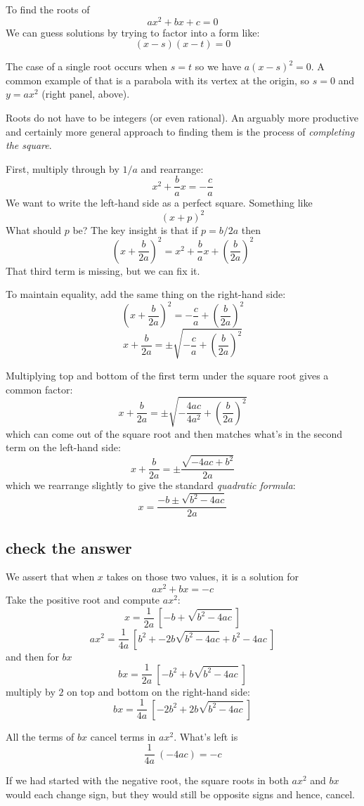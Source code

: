 \documentclass[11pt, oneside]{article}
\begin{document}
To find the roots of
\[ ax^2 + bx + c = 0 \]
We can guess solutions by trying to factor into a form like:
\[ (x - s)(x - t) = 0 \]

The case of a single root occurs when $s = t$ so we have $a(x - s)^2 = 0$.  A common example of that is a parabola with its vertex at the origin, so $s = 0$ and $y = ax^2$ (right panel, above).

Roots do not have to be integers (or even rational).  An arguably more productive and certainly more general approach to finding them is the process of \emph{completing the square}.  

First, multiply through by $1/a$ and rearrange:
\[ x^2 + \frac{b}{a} x = - \frac{c}{a} \]
We want to write the left-hand side as a perfect square.  Something like
\[ (x + p)^2 \]
What should $p$ be?  The key insight is that if $p = b/2a$ then
\[ (x + \frac{b}{2a})^2 = x^2 + \frac{b}{a}x + (\frac{b}{2a})^2 \]
That third term is missing, but we can fix it.

To maintain equality, add the same thing on the right-hand side:
\[ (x + \frac{b}{2a})^2 = -\frac{c}{a} + (\frac{b}{2a})^2 \]
\[ x + \frac{b}{2a} = \pm \sqrt{-\frac{c}{a} + (\frac{b}{2a})^2} \]

Multiplying top and bottom of the first term under the square root gives a common factor:
\[ x + \frac{b}{2a} = \pm \sqrt{-\frac{4ac}{4a^2} + (\frac{b}{2a})^2} \]
which can come out of the square root and then matches what's in the second term on the left-hand side:
\[ x + \frac{b}{2a} = \pm \frac{\sqrt{-4ac + b^2}}{2a} \]
which we rearrange slightly to give the standard \emph{quadratic formula}:
\[ x = \frac{-b \pm \sqrt{b^2 - 4ac}}{2a} \]

\subsection*{check the answer}
We assert that when $x$ takes on those two values, it is a solution for
\[ ax^2 + bx = -c \]
Take the positive root and compute $ax^2$:
\[ x = \frac{1}{2a} \ [ -b + \sqrt{b^2 - 4ac} \ ] \]
\[ ax^2 = \frac{1}{4a} \ [ b^2 + -2 b \sqrt{b^2 - 4ac} + b^2 - 4ac \ ] \]
and then for $bx$
\[ bx = \frac{1}{2a} \ [ -b^2 + b \sqrt{b^2 - 4ac} \ ] \]
multiply by $2$ on top and bottom on the right-hand side:
\[ bx = \frac{1}{4a} \ [ -2b^2 + 2b \sqrt{b^2 - 4ac} \ ] \]

All the terms of $bx$ cancel terms in $ax^2$.  What's left is
\[ \frac{1}{4a} \ (- 4ac) = -c \]

If we had started with the negative root, the square roots in both $ax^2$ and $bx$ would each change sign, but they would still be opposite signs and hence, cancel.
\end{document}
